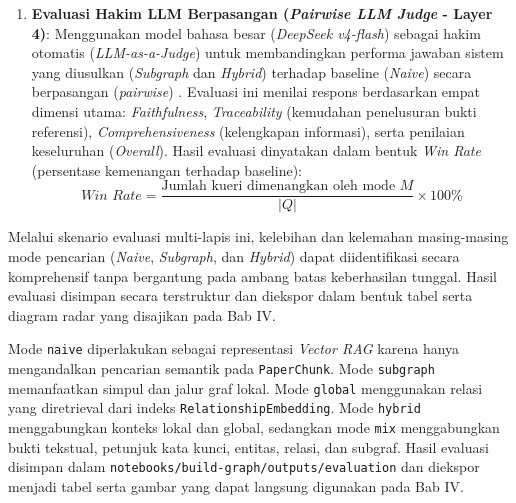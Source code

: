 \begin{enumerate}[label=\textbf{\arabic*.}, leftmargin=*, itemsep=10pt]
\begin{enumerate}[label=\arabic*., leftmargin=0.75cm, itemsep=4pt]
                    \textit{Answer Relevancy} mengukur relevansi semantik jawaban yang dihasilkan terhadap kueri pengguna dengan menghitung rata-rata kemiripan kosinus (\textit{cosine similarity}) dari representasi vektor kueri asli terhadap beberapa pertanyaan buatan yang dibangkitkan dari jawaban tersebut:
                    \begin{equation}
                        \textit{Answer Relevancy} = \frac{1}{m} \sum_{i=1}^{m} \cos(E_{q_i}, E_q)
                    \end{equation}
                    di mana $E_q$ adalah representasi vektor dari kueri asli, $E_{q_i}$ adalah vektor kueri buatan ke-$i$, dan $m$ adalah jumlah kueri buatan.

              \item \textbf{Evaluasi Hakim LLM Berpasangan (\textit{Pairwise LLM Judge} - Layer 4)}:
                    Menggunakan model bahasa besar (\textit{DeepSeek v4-flash}) sebagai hakim otomatis (\textit{LLM-as-a-Judge}) untuk membandingkan performa jawaban sistem yang diusulkan (\textit{Subgraph} dan \textit{Hybrid}) terhadap baseline (\textit{Naive}) secara berpasangan (\textit{pairwise}) \citep{zheng2023judging}. Evaluasi ini menilai respons berdasarkan empat dimensi utama: \textit{Faithfulness}, \textit{Traceability} (kemudahan penelusuran bukti referensi), \textit{Comprehensiveness} (kelengkapan informasi), serta penilaian keseluruhan (\textit{Overall}). Hasil evaluasi dinyatakan dalam bentuk \textit{Win Rate} (persentase kemenangan terhadap baseline):
                    \begin{equation}
                        \textit{Win Rate} = \frac{\text{Jumlah kueri dimenangkan oleh mode } M}{|Q|} \times 100\%
                    \end{equation}

          \end{enumerate}

          \hspace*{0.75cm}Melalui skenario evaluasi multi-lapis ini, kelebihan dan kelemahan masing-masing mode pencarian (\textit{Naive}, \textit{Subgraph}, dan \textit{Hybrid}) dapat diidentifikasi secara komprehensif tanpa bergantung pada ambang batas keberhasilan tunggal. Hasil evaluasi disimpan secara terstruktur dan diekspor dalam bentuk tabel serta diagram radar yang disajikan pada Bab IV.


          \hspace*{0.75cm}Mode \texttt{naive} diperlakukan sebagai representasi \textit{Vector RAG} karena hanya mengandalkan pencarian semantik pada \texttt{PaperChunk}. Mode \texttt{subgraph} memanfaatkan simpul dan jalur graf lokal. Mode \texttt{global} menggunakan relasi yang diretrieval dari indeks \texttt{RelationshipEmbedding}. Mode \texttt{hybrid} menggabungkan konteks lokal dan global, sedangkan mode \texttt{mix} menggabungkan bukti tekstual, petunjuk kata kunci, entitas, relasi, dan subgraf. Hasil evaluasi disimpan dalam \texttt{notebooks/build-graph/outputs/evaluation} dan diekspor menjadi tabel serta gambar yang dapat langsung digunakan pada Bab IV.



\end{enumerate}
